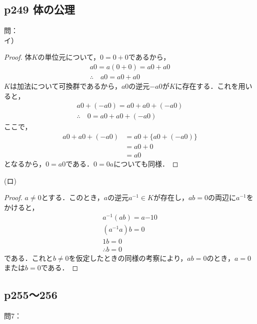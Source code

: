 \documentclass[dvipdfmx,uplatex,11pt]{jsarticle}
\theoremstyle{definition}
\begin{document}
\subsection{p249 体の公理}
問：\\
イ）
\begin{leftbar}
	\begin{proof}
		体$K$の単位元について，$0=0+0$であるから，
		\begin{gather*}
			a 0=a(0+0)=a0 + a0\\
			\therefore \quad  a0 = a0 + a0
		\end{gather*}
		$K$は加法について可換群であるから，$a0$の逆元$-a0$が$K$に存在する．これを用いると，
\begin{gather*}
	a0 + (-a0) = a0 + a0 + (-a0) \\
	\therefore \quad 0 = a0 + a0 +(-a0)
\end{gather*}
 ここで，
 \begin{align*}
	a0 + a0 +(-a0)&=a0+ \{a0+(-a0)\} \\
	& = a0 + 0 \\
	& = a0
 \end{align*}
となるから，$0=a0$である．$0=0a$についても同様．
\end{proof}
\end{leftbar}
(ロ)
\begin{leftbar}
    \begin{proof}
        $a \ne 0$とする．このとき，$a$の逆元$a^{-1} \in K$が存在し，$ab=0$の両辺に$a^{-1}$をかけると，
        \begin{gather*}
            a^{-1} (ab) = a{-1} 0 \\
            (a^{-1}a)b =0 \\
            1b =0 \\
            \therefore b=0
        \end{gather*}
        である．これと$b \ne 0$を仮定したときの同様の考察により，$ab=0$のとき，$a=0$または$b=0$である．
    \end{proof}
\end{leftbar}

\newpage 

\setcounter{equation}{0}
\subsection{p255～256}

問7：
\end{document}
